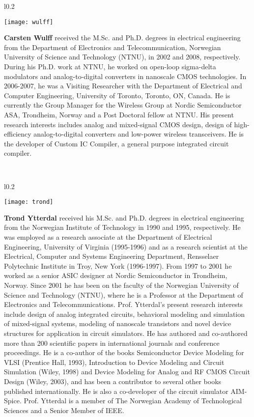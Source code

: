 
\begin{wrapfigure}{l}{0.2\textwidth}
\centerline{\texttt{[image: wulff]} }
\end{wrapfigure}

 \textbf{Carsten Wulff}
received the M.Sc. and Ph.D. degrees in
electrical engineering from the Department of Electronics and Telecommunication, Norwegian University of Science and Technology (NTNU),
in 2002 and 2008, respectively. 
During his Ph.D. work at NTNU, he worked on open-loop sigma-delta
modulators and analog-to-digital converters in nanoscale CMOS
technologies. In 2006-2007, he was a Visiting Researcher with the
Department of Electrical and Computer Engineering, University of
Toronto, Toronto, ON, Canada. He is currently the Group Manager for the
Wireless Group at Nordic Semiconductor ASA, Trondheim, Norway and a
Post Doctoral fellow at NTNU. His
present research interests includes analog and mixed-signal CMOS
design, design of high-efficiency analog-to-digital converters and
low-power wireless transceivers. He is the developer of Custom IC
Compiler, a general purpose integrated circuit compiler.

\


\begin{wrapfigure}{l}{0.2\textwidth}
\centerline{\texttt{[image: trond]} }
\end{wrapfigure}

\textbf{Trond Ytterdal}
 received his M.Sc. and Ph.D. degrees in electrical engineering from the Norwegian Institute of Technology in 1990 and 1995, respectively. He was employed as a research associate at the Department of Electrical Engineering, University of Virginia (1995-1996) and as a research scientist at the Electrical, Computer and Systems Engineering Department, Rensselaer Polytechnic Institute in Troy, New York (1996-1997). From 1997 to 2001 he worked as a senior ASIC designer at Nordic Semiconductor in Trondheim, Norway. Since 2001 he has been on the faculty of the Norwegian University of Science and Technology (NTNU), where he is a Professor at the Department of Electronics and Telecommunications. Prof. Ytterdal's present research interests include design of analog integrated circuits, behavioral modeling and simulation of mixed-signal systems, modeling of nanoscale transistors and novel device structures for application in circuit simulators. He has authored and co-authored more than 200 scientific papers in international journals and conference proceedings. He is a co-author of the books Semiconductor Device Modeling for VLSI (Prentice Hall, 1993), Introduction to Device Modeling and Circuit Simulation (Wiley, 1998) and Device Modeling for Analog and RF CMOS Circuit Design (Wiley, 2003), and has been a contributor to several other books published internationally. He is also a co-developer of the circuit simulator AIM-Spice. Prof. Ytterdal is a member of The Norwegian Academy of Technological Sciences and a Senior Member of IEEE.
